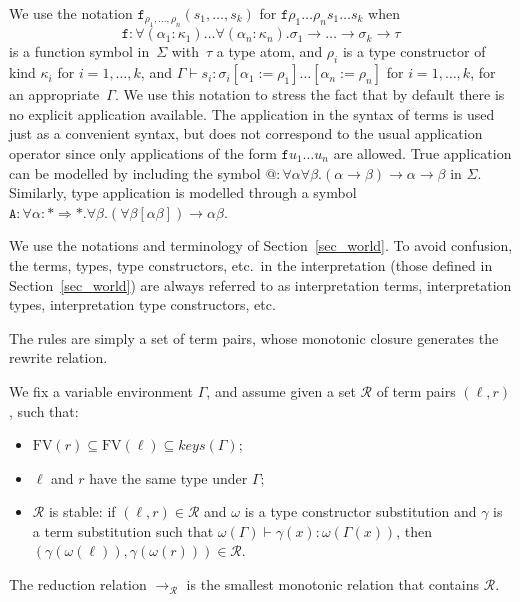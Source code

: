 \documentclass[runningheads,a4paper]{llncs}
\newcommand{\Rules}{\mathcal{R}}
\newcommand{\arr}[1]{\longrightarrow_{#1}}
\newcommand{\arrtype}{\rightarrow}
\newcommand{\arrkind}{\Rightarrow}
\newcommand{\FV}{\mathrm{FV}}
\newcommand{\proves}{\vdash}
\begin{document}
We use the notation
$\mathtt{f}_{\rho_1,\ldots,\rho_n}(s_1,\ldots,s_k)$ for
$\mathtt{f} \rho_1 \ldots \rho_n s_1 \ldots s_k$ when
\[
  \mathtt{f} : \forall (\alpha_1 : \kappa_1) \ldots
  \forall (\alpha_n : \kappa_n) . \sigma_1 \arrtype \ldots \arrtype
  \sigma_k \arrtype \tau
\]
is a function symbol in~$\Sigma$ with~$\tau$ a type atom, and $\rho_i$
is a type constructor of kind $\kappa_i$ for $i=1,\ldots,k$, and
$\Gamma \proves s_i : \sigma_i[\alpha_1 := \rho_1]\ldots[\alpha_n :=
  \rho_n]$ for $i=1,\ldots,k$, for an appropriate~$\Gamma$. We use
this notation to stress the fact that by default there is no explicit
application available. The application in the syntax of terms is used
just as a convenient syntax, but does not correspond to the usual
application operator since only applications of the form $\mathtt{f}
u_1 \ldots u_n$ are allowed. True application can be modelled by
including the symbol ${@} : \forall\alpha\forall\beta . (\alpha
\arrtype \beta) \arrtype \alpha \arrtype \beta$ in
$\Sigma$. Similarly, type application is modelled through a symbol
$\mathtt{A} : \forall \alpha : * \arrkind * . \forall \beta . (\forall
\beta [\alpha \beta]) \arrtype \alpha \beta$.

We use the notations and terminology of Section~\ref{sec_world}. To
avoid confusion, the terms, types, type constructors, etc.~in the
interpretation (those defined in Section~\ref{sec_world}) are always
referred to as interpretation terms, interpretation types,
interpretation type constructors, etc.

The rules are simply a set of term pairs, whose monotonic closure
generates the rewrite relation.

\begin{definition}\normalfont
We fix a variable environment $\Gamma$, and assume given a set
$\Rules$ of term pairs $(\ell,r)$, such that:
\begin{itemize}
\item $\FV(r) \subseteq \FV(\ell) \subseteq \mathit{keys}(\Gamma)$;
\item $\ell$ and $r$ have the same type under $\Gamma$;
\item $\Rules$ is stable: if $(\ell,r) \in \Rules$ and $\omega$ is a
  type constructor substitution and $\gamma$ is a term substitution
  such that $\omega(\Gamma) \proves \gamma(x) : \omega(\Gamma(x))$,
  then $(\gamma(\omega(\ell)),\gamma(\omega(r))) \in \Rules$.
\end{itemize}
The reduction relation $\arr{\Rules}$ is the smallest monotonic
relation that contains $\Rules$.
\end{definition}
\end{document}
